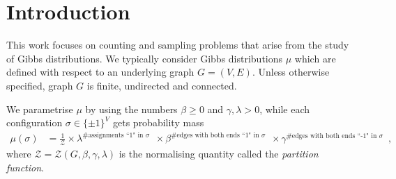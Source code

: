 \documentclass[11pt,reqno]{amsart}
\numberwithin{equation}{section}
\newcommand{\cR}{{\mathcal{R}}}
\newcommand{\applegreen}[1]{ {\color{applegreen}#1}}
\newcommand{\bluepigment}[1]{{\color{blue(pigment)}#1}}
\newcommand{\byzantine}[1]{{\color{byzantine}#1}}
\newcommand{\cadmiumgreen}[1]{{\color{cadmiumgreen}#1}}
\newcommand{\racinggreen}[1]{{\color{britishracinggreen}#1}}
\newcommand{\PartFun}{\mathcal{Z}}
\newcommand{\spreadpoint}{\newpage}
\newcommand{\LastReviewG}[1]{{\color{magenta}\hspace{.2cm} [Rev: \textrm{#1} - \bluepigment{G} ] \hspace{.2cm}}}
\renewcommand{\LastReviewG}[1]{}
\renewcommand{\spreadpoint}{}
\renewcommand{\applegreen}[1]{#1}
\renewcommand{\bluepigment}[1]{#1}
\renewcommand{\byzantine}[1]{#1}
\renewcommand{\cadmiumgreen}[1]{#1}
\renewcommand{\racinggreen}[1]{#1}
\newcommand{\kell}{{\color{green(pigment)}\ell}}%
\renewcommand{\kell}{\ell}
\begin{document}
% 



\spreadpoint



\thispagestyle{empty}



\spreadpoint



%




\newpage
\setcounter{page}{1}



\newcommand{\SingleEdgeM}{\UpC}

\newcommand{\chiofh}{\uppsi}



\newcommand{\gext}[2]{\racinggreen{ {#1}_{#2}} }
\newcommand{\sbsplit}{\byzantine{\partial \UpS}}
\newcommand{\ssplit}{\cadmiumgreen{\UpS}}



\newcommand{\subcont}{{\cR}^{(\kell)}}


\newcommand{\inflPotB}{\mathcal{H}}





\section{Introduction \LastReviewG{2025-03-28} }\label{sec:Introduction}
This work focuses on counting and sampling problems that arise from the study of Gibbs distributions.
We  typically consider  Gibbs distributions $\mu$ which are defined with respect to an underlying 
graph $G=(V,E)$. Unless otherwise specified,  graph $G$ is finite, undirected and connected.

%
We parametrise $\mu$ by using the numbers $\beta \geq 0$ and $\gamma, \lambda >0$, while each configuration $\sigma\in \{\pm 1\}^V$ 
gets probability mass 
\begin{align}\label{def:GibbDistr}
\mu(\sigma) &=\frac{1}{\PartFun} \times \lambda^{\# \textrm{assignments ``1" in $\sigma$ } }
\times \beta^{\# \textrm{edges with both ends ``1" in $\sigma$ } }
\times \gamma^{\# \textrm{edges with both ends ``-1" in $\sigma$} } \enspace,
\end{align}
where $\PartFun=\PartFun(G,\beta,\gamma, \lambda)$ is the normalising quantity called the {\em partition function}. 
\end{document}
